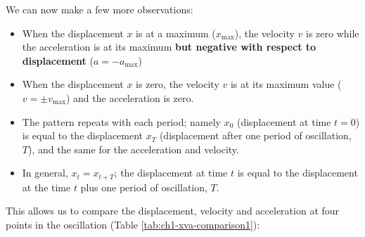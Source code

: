 \documentclass[
]{book}
\providecommand{\tightlist}{%
  \setlength{\itemsep}{0pt}\setlength{\parskip}{0pt}}
\begin{document}
We can now make a few more observations:

\begin{itemize}
\tightlist
\item
  When the displacement \(x\) is at a maximum (\(x_\textrm{max}\)), the velocity \(v\) is zero while the acceleration is at its maximum \textbf{but negative with respect to displacement} (\(a= -a_\textrm{max}\))
\item
  When the displacement \(x\) is zero, the velocity \(v\) is at its maximum value (\(v = \pm v_\textrm{max}\)) and the acceleration is zero.
\item
  The pattern repeats with each period; namely \(x_0\) (displacement at time \(t = 0\)) is equal to the displacement \(x_T\) (displacement after one period of oscillation, \(T\)), and the same for the acceleration and velocity.
\item
  In general, \(x_t = x_{t+T}\); the displacement at time \(t\) is equal to the displacement at the time \(t\) plus one period of oscillation, \(T\).
\end{itemize}

This allows us to compare the displacement, velocity and acceleration at four points in the oscillation (Table \ref{tab:ch1-xva-comparison1}):
\end{document}
